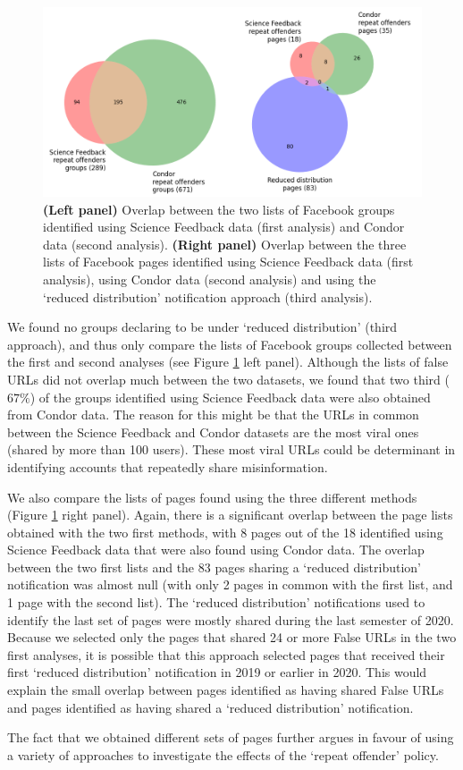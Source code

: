 \documentclass[review]{elsarticle}
\begin{document}
\begin{figure}[!h]
\centering
\includegraphics[scale=0.5]{./../figure/supplementary_venn_groups_and_pages.png}
\caption{
\textbf{(Left panel)} Overlap between the two lists of Facebook groups identified using Science Feedback data (first analysis) and Condor data (second analysis). \textbf{(Right panel)} Overlap between the three lists of Facebook pages identified using Science Feedback data (first analysis), using Condor data (second analysis) and using the `reduced distribution' notification approach (third analysis).
}
\label{venn_accounts}
\end{figure}

We found no groups declaring to be under ‘reduced distribution’ (third approach), and thus only compare the lists of Facebook groups collected between the first and second analyses (see Figure \ref{venn_accounts} left panel).
Although the lists of false URLs did not overlap much between the two datasets, we found that two third ($67\%$) of the groups identified using Science Feedback data were also obtained from Condor data. 
The reason for this might be that the URLs in common between the Science Feedback and Condor datasets are the most viral ones (shared by more than 100 users). 
These most viral URLs could be determinant in identifying accounts that repeatedly share misinformation.

We also compare the lists of pages found using the three different methods (Figure \ref{venn_accounts} right panel).
Again, there is a significant overlap between the page lists obtained with the two first methods, with 8 pages out of the 18 identified using Science Feedback data that were also found using Condor data.
The overlap between the two first lists and the 83 pages sharing a `reduced distribution' notification was almost null (with only 2 pages in common with the first list, and 1 page with the second list).
The `reduced distribution' notifications used to identify the last set of pages were mostly shared during the last semester of 2020.
Because we selected only the pages that shared 24 or more False URLs in the two first analyses, it is possible that this approach selected pages that received their first `reduced distribution' notification in 2019 or earlier in 2020.
This would explain the small overlap between pages identified as having shared False URLs and pages identified as having shared a `reduced distribution' notification.

The fact that we obtained different sets of pages further argues in favour of using a variety of approaches to investigate the effects of the `repeat offender' policy.


\end{document}
